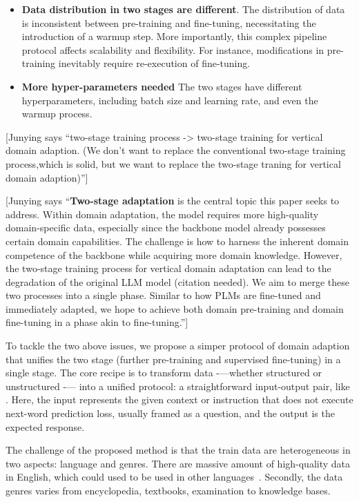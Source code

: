 \documentclass{article} %
\newcommand{\junying}[1]{{ \color{teal} [Junying says ``#1'']}}
\begin{document}
\begin{itemize}
    \item  \textbf{Data distribution in two stages are different}.  The distribution of data is inconsistent between pre-training and fine-tuning, necessitating the introduction of a warmup step. More importantly, this complex pipeline protocol affects scalability and flexibility. For instance, modifications in pre-training inevitably require re-execution of fine-tuning.
    \item \textbf{More hyper-parameters needed} The two stages have different hyperparameters, including batch size and learning rate, and even the warmup process.
\end{itemize}

\junying{two-stage training process -> two-stage training for vertical domain adaption. (We don't want to replace the conventional two-stage training process,which is solid, but we want to replace the two-stage traning for vertical domain adaption)}

\junying{\textbf{Two-stage adaptation} is the central topic this paper seeks to address. Within domain adaptation, the model requires more high-quality domain-specific data, especially since the backbone model already possesses certain domain capabilities. The challenge is how to harness the inherent domain competence of the backbone while acquiring more domain knowledge. However, the two-stage training process for vertical domain adaptation can lead to the degradation of the original LLM model (citation needed). We aim to merge these two processes into a single phase. Similar to how PLMs are fine-tuned and immediately adapted, we hope to achieve both domain pre-training and domain fine-tuning in a phase akin to fine-tuning.}



To tackle the two above issues, we propose a simper protocol of domain adaption that unifies the two stage (further pre-training and supervised fine-tuning) in a single stage.   The core recipe is to transform data -—whether structured or unstructured -— into a unified protocol: a straightforward input-output pair, like \cite{raffel2020exploring,yuan2022restructured}. Here, the input represents the given context or instruction that does not execute next-word prediction loss, usually framed as a question, and the output is the expected  response.




The challenge of the proposed method is that the  train data are heterogeneous in two aspects: language and genres. 
There are massive amount of high-quality data in English, which could used to be used in other languages~\cite{zeng2023glm-130b,yang2023baichuan}. Secondly, the data genres varies from  encyclopedia, textbooks, examination to  knowledge bases.
\end{document}
